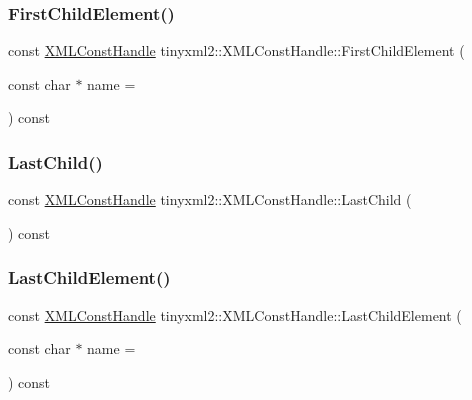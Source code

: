 \subsubsection{\texorpdfstring{First\+Child\+Element()}{FirstChildElement()}}
{\footnotesize\ttfamily const \hyperlink{classtinyxml2_1_1_x_m_l_const_handle}{X\+M\+L\+Const\+Handle} tinyxml2\+::\+X\+M\+L\+Const\+Handle\+::\+First\+Child\+Element (\begin{DoxyParamCaption}\item[{const char $\ast$}]{name = {} }\end{DoxyParamCaption}) const\hspace{0.3cm}{\ttfamily [inline]}}

\mbox{\label{classtinyxml2_1_1_x_m_l_const_handle_a908436124990f3d7b35cb7df20d31d9e}} 
\subsubsection{\texorpdfstring{Last\+Child()}{LastChild()}}
{\footnotesize\ttfamily const \hyperlink{classtinyxml2_1_1_x_m_l_const_handle}{X\+M\+L\+Const\+Handle} tinyxml2\+::\+X\+M\+L\+Const\+Handle\+::\+Last\+Child (\begin{DoxyParamCaption}{ }\end{DoxyParamCaption}) const\hspace{0.3cm}{\ttfamily [inline]}}

\mbox{\label{classtinyxml2_1_1_x_m_l_const_handle_a9de0475ec42bd50c0e64624a250ba5b2}} 
\subsubsection{\texorpdfstring{Last\+Child\+Element()}{LastChildElement()}}
{\footnotesize\ttfamily const \hyperlink{classtinyxml2_1_1_x_m_l_const_handle}{X\+M\+L\+Const\+Handle} tinyxml2\+::\+X\+M\+L\+Const\+Handle\+::\+Last\+Child\+Element (\begin{DoxyParamCaption}\item[{const char $\ast$}]{name = {} }\end{DoxyParamCaption}) const\hspace{0.3cm}{\ttfamily [inline]}}

